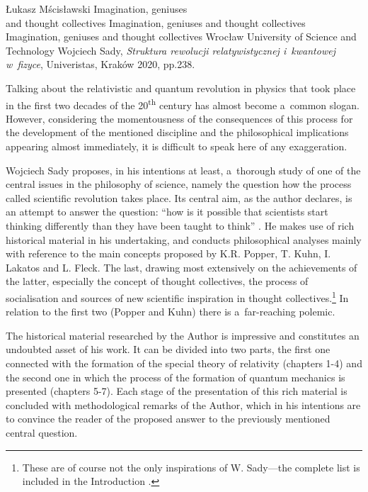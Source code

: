 \begin{newrevengenv}{Łukasz Mścisławski}
	{Imagination, geniuses\\and thought collectives}
	{Imagination, geniuses and thought collectives}
	{Imagination, geniuses and thought collectives}
	{Wrocław University of Science and Technology}
	{Wojciech Sady, \textit{Struktura rewolucji relatywistycznej i~kwantowej w~fizyce}, Univeristas, Kraków 2020, pp.238.}
	
	


\lettrine[loversize=0.13,lines=2,lraise=-0.03,nindent=0em,findent=0.2pt]%
{T}{}alking about the relativistic and quantum revolution in physics that took place in the first two decades of the 20\textsuperscript{th} century has almost become a~common slogan. However, considering the momentousness of the consequences of this process for the development of the mentioned discipline and the philosophical implications appearing almost immediately, it is difficult to speak here of any exaggeration.

Wojciech Sady proposes, in his intentions at least, a~thorough study of one of the central issues in the philosophy of science, namely the question how the process called scientific revolution takes place. Its central aim, as the author declares, is an attempt to answer the question: ``how is it possible that scientists start thinking differently than they have been taught to think''
\parencite[][p.26]{sady_struktura_2020}. %
 He makes use of rich historical material in his undertaking, and conducts philosophical analyses mainly with reference to the main concepts proposed by K.R. Popper, T. Kuhn, I. Lakatos and L. Fleck. The last, drawing most extensively on the achievements of the latter, especially the concept of thought collectives, the process of socialisation and sources of new scientific inspiration in thought collectives.\footnote{These are of course not the only inspirations of W. Sady---the complete list is included in the Introduction  
\parencite[cf.][pp.15--17]{sady_struktura_2020}.%
} In relation to the first two (Popper and Kuhn) there is a~far-reaching polemic.

The historical material researched by the Author is impressive and constitutes an undoubted asset of his work. It can be divided into two parts, the first one connected with the formation of the special theory of relativity (chapters 1-4) and the second one in which the process of the formation of quantum mechanics is presented (chapters 5-7). Each stage of the presentation of this rich material is concluded with methodological remarks of the Author, which in his intentions are to convince the reader of the proposed answer to the previously mentioned central question.


\end{newrevengenv}
